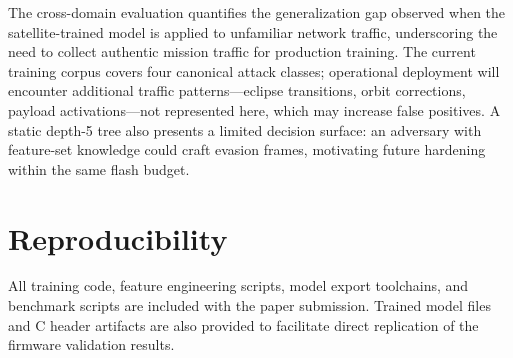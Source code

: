 The cross-domain evaluation quantifies the generalization gap observed when the satellite-trained model is applied to unfamiliar network traffic, underscoring the need to collect authentic mission traffic for production training. The current training corpus covers four canonical attack classes; operational deployment will encounter additional traffic patterns---eclipse transitions, orbit corrections, payload activations---not represented here, which may increase false positives. A static depth-5 tree also presents a limited decision surface: an adversary with feature-set knowledge could craft evasion frames, motivating future hardening within the same flash budget.

\section*{Reproducibility}
All training code, feature engineering scripts, model export toolchains, and benchmark scripts are included with the paper submission. Trained model files and C header artifacts are also provided to facilitate direct replication of the firmware validation results.